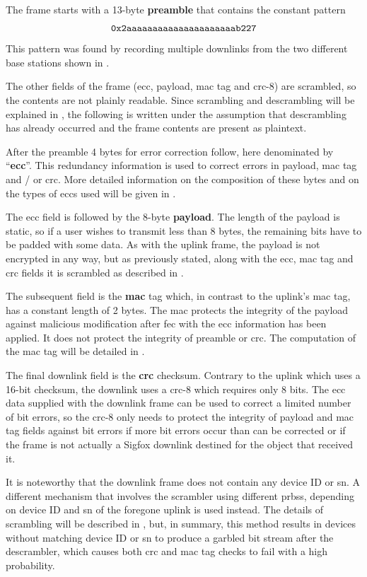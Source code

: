 The frame starts with a 13-byte \textbf{preamble} that contains the constant pattern
\[
	\text{\texttt{0x2aaaaaaaaaaaaaaaaaaaaab227}}
\]
This pattern was found by recording multiple downlinks from the two different base stations shown in .

The other fields of the frame (\gls{ecc}, payload, \gls{mac} tag and \gls{crc}-8) are scrambled, so the contents are not plainly readable.
Since scrambling and descrambling will be explained in , the following is written under the assumption that descrambling has already occurred and the frame contents are present as plaintext.

After the preamble 4 bytes for error correction follow, here denominated by ``\textbf{\gls{ecc}}''.
This redundancy information is used to correct errors in payload, \gls{mac} tag and / or \gls{crc}.
More detailed information on the composition of these bytes and on the types of \glspl{ecc} used will be given in .

The \gls{ecc} field is followed by the 8-byte \textbf{payload}.
The length of the payload is static, so if a user wishes to transmit less than 8 bytes, the remaining bits have to be padded with some data.
As with the uplink frame, the payload is not encrypted in any way, but as previously stated, along with the \gls{ecc}, \gls{mac} tag and \gls{crc} fields it is scrambled as described in .

The subsequent field is the \textbf{\gls{mac}} tag which, in contrast to the uplink's \gls{mac} tag, has a constant length of 2 bytes.
The \gls{mac} protects the integrity of the payload against malicious modification after \gls{fec} with the \gls{ecc} information has been applied.
It does not protect the integrity of preamble or \gls{crc}.
The computation of the \gls{mac} tag will be detailed in .

The final downlink field is the \textbf{\gls{crc}} checksum.
Contrary to the uplink which uses a 16-bit checksum, the downlink uses a \gls{crc}-8 which requires only 8 bits.
The \gls{ecc} data supplied with the downlink frame can be used to correct a limited number of bit errors, so the \gls{crc}-8 only needs to protect the integrity of payload and \gls{mac} tag fields against bit errors if more bit errors occur than can be corrected or if the frame is not actually a Sigfox downlink destined for the object that received it.

It is noteworthy that the downlink frame does not contain any device ID or \gls{sn}.
A different mechanism that involves the scrambler using different \glspl{prbs}, depending on device ID and \gls{sn} of the foregone uplink is used instead.
The details of scrambling will be described in , but, in summary, this method results in devices without matching device ID or \gls{sn} to produce a garbled bit stream after the descrambler, which causes both \gls{crc} and \gls{mac} tag checks to fail with a high probability.

